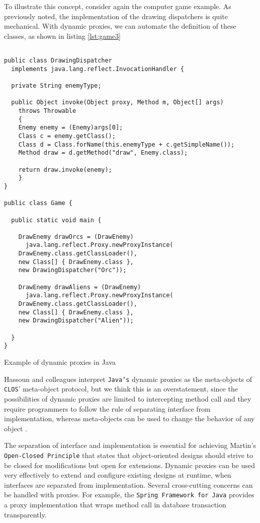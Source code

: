 To illustrate this concept, consider again the computer game example. As previously noted, the implementation of the drawing dispatchers
is quite mechanical. With dynamic proxies, we can automate the definition of these classes, as shown in listing \ref{lst:game3}

\begin{listing}[H]
\begin{verbatim}

public class DrawingDispatcher 
  implements java.lang.reflect.InvocationHandler {
  
  private String enemyType;
  
  public Object invoke(Object proxy, Method m, Object[] args)
	throws Throwable
    {
	Enemy enemy = (Enemy)args[0];
	Class c = enemy.getClass();    
	Class d = Class.forName(this.enemyType + c.getSimpleName());    
	Method draw = d.getMethod("draw", Enemy.class);
	
	return draw.invoke(enemy);
    }
}

public class Game {

  public static void main {
  
    DrawEnemy drawOrcs = (DrawEnemy)
      java.lang.reflect.Proxy.newProxyInstance(
	DrawEnemy.class.getClassLoader(),
	new Class[] { DrawEnemy.class },
	new DrawingDispatcher("Orc"));
					
    DrawEnemy drawAliens = (DrawEnemy)
      java.lang.reflect.Proxy.newProxyInstance(
	DrawEnemy.class.getClassLoader(),
	new Class[] { DrawEnemy.class },
	new DrawingDispatcher("Alien"));
    
  }
}
\end{verbatim}
\caption{Example of dynamic proxies in Java}
\label{lst:game3}
\end{listing}

Hassoun and colleagues interpret \texttt{Java's} dynamic proxies as the meta-objects of \texttt{CLOS}' meta-object protocol, but
we think this is an overstatement, since the possibilities of dynamic proxies are limited to intercepting method call and
they require programmers to follow the rule of separating interface from implementation, whereas meta-objects can
be used to change the behavior of any object \cite{Hassoun03, Hassoun05}. 

The separation of interface and implementation is essential for achieving Martin's \texttt{Open-Closed Principle} that states
that object-oriented designs should strive to be closed for modifications but open for extensions. Dynamic proxies can
be used very effectively to extend and configure existing designs at runtime, when interfaces are separated from implementation.
Several cross-cutting concerns can be handled with proxies. For example, the \texttt{Spring Framework for Java} provides a
proxy implementation that wraps method call in database transaction transparently.

